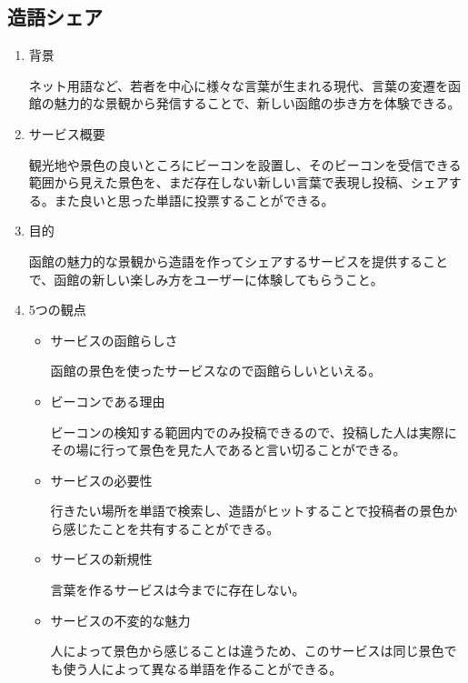 \subsection{造語シェア}
\begin{enumerate}
    \item 背景
    \par ネット用語など、若者を中心に様々な言葉が生まれる現代、言葉の変遷を函館の魅力的な景観から発信することで、新しい函館の歩き方を体験できる。
    \item サービス概要
    \par 観光地や景色の良いところにビーコンを設置し、そのビーコンを受信できる範囲から見えた景色を、まだ存在しない新しい言葉で表現し投稿、シェアする。また良いと思った単語に投票することができる。
    \item 目的
    \par 函館の魅力的な景観から造語を作ってシェアするサービスを提供することで、函館の新しい楽しみ方をユーザーに体験してもらうこと。
    \item 5つの観点
    \begin{itemize}
        \item サービスの函館らしさ
        \par 函館の景色を使ったサービスなので函館らしいといえる。
        \item ビーコンである理由
        \par ビーコンの検知する範囲内でのみ投稿できるので、投稿した人は実際にその場に行って景色を見た人であると言い切ることができる。
        \item サービスの必要性
        \par 行きたい場所を単語で検索し、造語がヒットすることで投稿者の景色から感じたことを共有することができる。
        \item サービスの新規性
        \par 言葉を作るサービスは今までに存在しない。
        \item サービスの不変的な魅力
        \par 人によって景色から感じることは違うため、このサービスは同じ景色でも使う人によって異なる単語を作ることができる。
    \end{itemize}
\end{enumerate}

